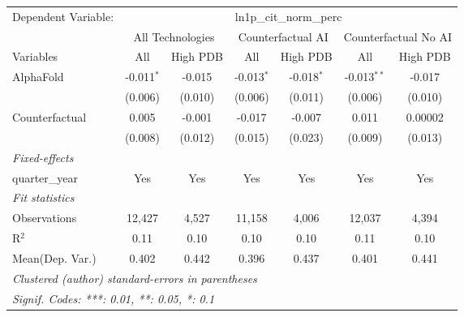\begingroup
\centering
\begin{tabular}{lcccccc}
   \tabularnewline \midrule \midrule
   Dependent Variable: & \multicolumn{6}{c}{ln1p\_cit\_norm\_perc}\\
 & \multicolumn{2}{c}{All Technologies} & \multicolumn{2}{c}{Counterfactual AI} & \multicolumn{2}{c}{Counterfactual No AI} \\
\cmidrule(lr){1-1}\cmidrule(lr){2-3} \cmidrule(lr){4-5} \cmidrule(lr){6-7}
Variables & \multicolumn{1}{c}{All} & \multicolumn{1}{c}{High PDB} & \multicolumn{1}{c}{All} & \multicolumn{1}{c}{High PDB} & \multicolumn{1}{c}{All} & \multicolumn{1}{c}{High PDB} \\
\cmidrule(lr){1-1}\cmidrule(lr){2-2} \cmidrule(lr){3-3} \cmidrule(lr){4-4} \cmidrule(lr){5-5} \cmidrule(lr){6-6} \cmidrule(lr){7-7}
   AlphaFold      & -0.011$^{*}$ & -0.015  & -0.013$^{*}$ & -0.018$^{*}$ & -0.013$^{**}$ & -0.017\\   
                  & (0.006)      & (0.010) & (0.006)      & (0.011)      & (0.006)       & (0.010)\\   
   Counterfactual & 0.005        & -0.001  & -0.017       & -0.007       & 0.011         & 0.00002\\   
                  & (0.008)      & (0.012) & (0.015)      & (0.023)      & (0.009)       & (0.013)\\   
   \midrule
   \emph{Fixed-effects}\\
   quarter\_year  & Yes          & Yes     & Yes          & Yes          & Yes           & Yes\\  
   \midrule
   \emph{Fit statistics}\\
   Observations   & 12,427       & 4,527   & 11,158       & 4,006        & 12,037        & 4,394\\  
   R$^2$          & 0.11         & 0.10    & 0.10         & 0.10         & 0.11          & 0.10\\  
Mean(Dep. Var.) & 0.402 & 0.442 & 0.396 & 0.437 & 0.401 & 0.441 \\
   \midrule \midrule
   \multicolumn{7}{l}{\emph{Clustered (author) standard-errors in parentheses}}\\
   \multicolumn{7}{l}{\emph{Signif. Codes: ***: 0.01, **: 0.05, *: 0.1}}\\
\end{tabular}
\par\endgroup
